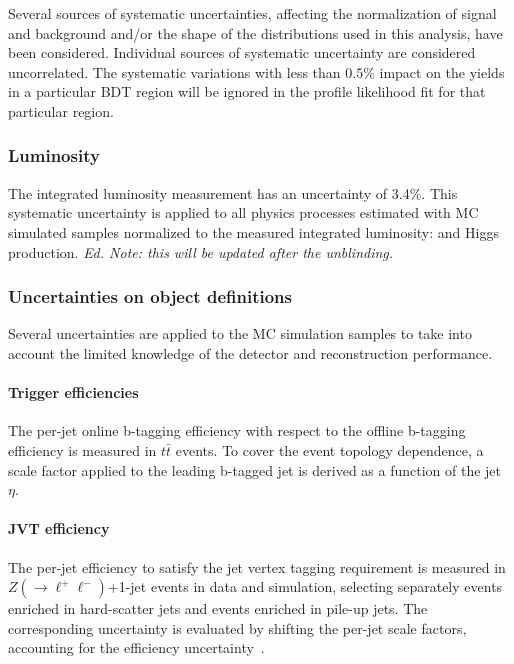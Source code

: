 \label{sec:vbf-uncertainties}

Several sources of systematic uncertainties,
affecting the normalization of signal and background and/or the shape of
the distributions used in this analysis, have been considered.  Individual sources of systematic 
uncertainty are considered uncorrelated. The systematic variations with less than $0.5\%$ impact 
on the yields in a particular BDT region will be ignored in the profile likelihood fit for 
that particular region. 

\subsubsection{Luminosity}
\label{sec:vbf-syst_lumi}

The integrated luminosity measurement has an uncertainty of 3.4\%. This systematic uncertainty
is applied to all physics processes estimated with MC simulated samples normalized 
to the measured integrated luminosity: \zjets{} and Higgs production. {\it Ed. Note: this will be updated after the unblinding.}

\subsubsection{Uncertainties on object definitions}
\label{sec:vbf-syst_objects}

Several uncertainties are applied to the MC simulation samples to take into account the limited knowledge of the detector and reconstruction performance.

\paragraph{Trigger efficiencies}

The per-jet online b-tagging efficiency with respect to the offline b-tagging efficiency is measured in $t\bar t$ events. 
To cover the event topology dependence, a scale factor applied to the leading b-tagged jet is derived as a function of the jet $\eta$. 

\paragraph{JVT efficiency}
The per-jet efficiency to satisfy the jet vertex tagging requirement
is measured in $Z(\to \ell^+\ell^-)$+1-jet events in data and simulation,
selecting separately events enriched in hard-scatter jets and events enriched in pile-up jets. 
The corresponding uncertainty is evaluated by shifting the per-jet scale factors,
accounting for the efficiency uncertainty~\cite{JVTwiki}.

